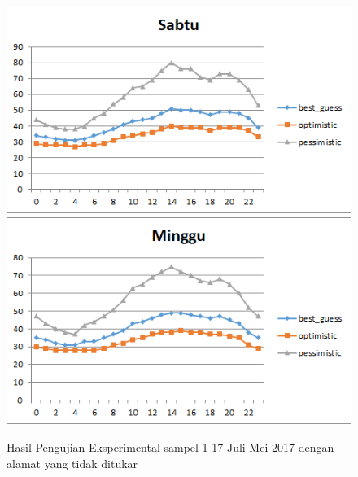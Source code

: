\begin{figure}[H]
				\centering	
				\includegraphics[]{Gambar/sabtusampel117072017normal.png}
				\includegraphics[]{Gambar/minggusampel117072017normal.png}
				\caption[Hasil Pengujian Eksperimental]{Hasil Pengujian Eksperimental sampel 1 17 Juli Mei 2017 dengan alamat yang tidak ditukar}
				\label{fig:eksperimentalsampel117072017normal}
\end{figure}

\newpage
				
